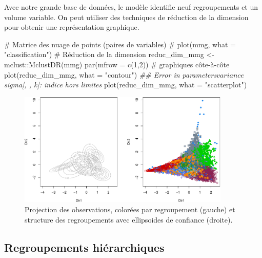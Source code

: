 \documentclass[
  11pt,
  letterpaper,
]{scrbook}
\newenvironment{Shaded}{\begin{snugshade}}{\end{snugshade}}
\newcommand{\AttributeTok}[1]{\textcolor[rgb]{0.40,0.45,0.13}{#1}}
\newcommand{\CommentTok}[1]{\textcolor[rgb]{0.37,0.37,0.37}{#1}}
\newcommand{\DecValTok}[1]{\textcolor[rgb]{0.68,0.00,0.00}{#1}}
\newcommand{\DocumentationTok}[1]{\textcolor[rgb]{0.37,0.37,0.37}{\textit{#1}}}
\newcommand{\FunctionTok}[1]{\textcolor[rgb]{0.28,0.35,0.67}{#1}}
\newcommand{\NormalTok}[1]{\textcolor[rgb]{0.00,0.23,0.31}{#1}}
\newcommand{\OtherTok}[1]{\textcolor[rgb]{0.00,0.23,0.31}{#1}}
\newcommand{\SpecialCharTok}[1]{\textcolor[rgb]{0.37,0.37,0.37}{#1}}
\newcommand{\StringTok}[1]{\textcolor[rgb]{0.13,0.47,0.30}{#1}}
\theoremstyle{definition}
\theoremstyle{remark}
\begin{document}
Avec notre grande base de données, le modèle identifie neuf
regroupements et un volume variable. On peut utiliser des techniques de
réduction de la dimension pour obtenir une représentation graphique.

\begin{Shaded}
\begin{Highlighting}[]
\CommentTok{\# Matrice des nuage de points (paires de variables)}
\CommentTok{\# plot(mmg, what = "classification")}
\CommentTok{\# Réduction de la dimension}
\NormalTok{reduc\_dim\_mmg }\OtherTok{\textless{}{-}}\NormalTok{ mclust}\SpecialCharTok{::}\FunctionTok{MclustDR}\NormalTok{(mmg)}
\FunctionTok{par}\NormalTok{(}\AttributeTok{mfrow =} \FunctionTok{c}\NormalTok{(}\DecValTok{1}\NormalTok{,}\DecValTok{2}\NormalTok{)) }\CommentTok{\# graphiques côte{-}à{-}côte}
\FunctionTok{plot}\NormalTok{(reduc\_dim\_mmg, }\AttributeTok{what =} \StringTok{"contour"}\NormalTok{)}
\DocumentationTok{\#\# Error in parameters$variance$sigma[, , k]: indice hors limites}
\FunctionTok{plot}\NormalTok{(reduc\_dim\_mmg, }\AttributeTok{what =} \StringTok{"scatterplot"}\NormalTok{)}
\end{Highlighting}
\end{Shaded}

\begin{figure}[ht!]

{\centering \includegraphics[width=0.9\textwidth,height=\textheight]{./03-regroupements_files/figure-pdf/fig-classifreducmclust-1.pdf}

}

\caption{\label{fig-classifreducmclust}Projection des observations,
colorées par regroupement (gauche) et structure des regroupements avec
ellipsoides de confiance (droite).}

\end{figure}

\hypertarget{regroupements-hiuxe9rarchiques}{%
\subsection{Regroupements
hiérarchiques}\label{regroupements-hiuxe9rarchiques}}
\end{document}
